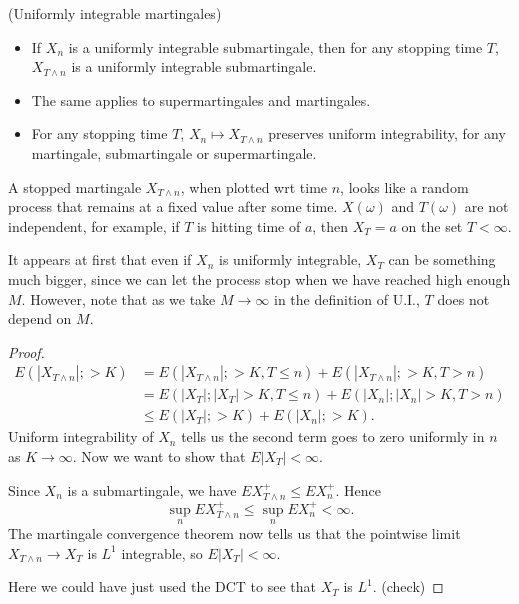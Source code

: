 \begin{proposition}
	(Uniformly integrable martingales)
	\label{prop:UIMartingale}
	\begin{itemize}
		\item If $X_n$ is a uniformly integrable submartingale, then for any stopping time $T$, $X_{T \wedge n}$ is a uniformly integrable submartingale.
		\item The same applies to supermartingales and martingales.
		\item For any stopping time $T$, $X_n \mapsto X_{T \wedge n}$ preserves uniform integrability, for any martingale, submartingale or supermartingale.
	\end{itemize}
\end{proposition}
\begin{intuition}
	A stopped martingale $X_{T \wedge n}$, when plotted wrt time $n$, looks like a random process that remains at a fixed value after some time. $X(\omega)$ and $T(\omega)$ are not independent, for example, if  $T$ is hitting time of $a$, then $X_T = a$ on the set $T < \infty $.

	It appears at first that even if  $X_n$ is uniformly integrable, $X_T$ can be something much bigger, since we can let the process stop when we have reached high enough $M$. However, note that as we take $M \to \infty $ in the definition of U.I., $T$ does not depend on $M$.
\end{intuition}
\begin{proof}
	\begin{align*}
		E\left( |X_{T \wedge n}|; > K \right) 
		&= E\left( |X_{T \wedge n}|; > K, T \le n \right) 
		+ E\left( |X_{T \wedge n}|; > K, T > n \right) \\
		&= E\left( |X_{T}|; |X_{T}|> K, T \le n \right) 
		+ E\left( |X_{n}|; |X_n|> K, T > n \right) \\
		&\le E\left( |X_T|; > K \right) + E\left( |X_n|; > K \right) 
	.\end{align*} 
	Uniform integrability of $X_n$ tells us the second term goes to zero uniformly in $n$ as $K \to  \infty $. Now we want to show that $E|X_T|< \infty $. 
	
	Since $X_n$ is a submartingale, we have $E X_{T \wedge n}^+ \le  E X_n^+$. Hence
	\[
		\sup_n E X_{T \wedge n}^+ 
		\le 
		\sup_n E X_{n}^+ 
		< \infty 
	.\] 
	The martingale convergence theorem now tells us that the pointwise limit $X_{T \wedge n} \to  X_T$ is $L^1$ integrable, so $E|X_T| < \infty $.

	Here we could have just used the DCT to see that $X_T$ is $L^1$. (check)
\end{proof}






